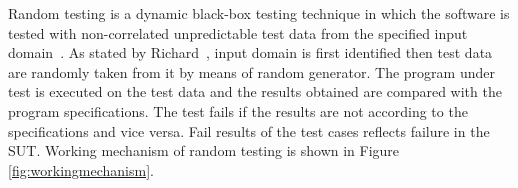 
Random testing is a dynamic black-box testing technique in which the software is tested with non-correlated unpredictable test data from the specified input domain~\cite{chan2003normalized}. As stated by Richard~\cite{hamlet1994random}, input domain is first identified then test data are randomly taken from it by means of random generator. The program under test is executed on the test data and the results obtained are compared with the program specifications. The test fails if the results are not according to the specifications and vice versa. Fail results of the test cases reflects failure in the SUT. Working mechanism of random testing is shown in Figure \ref{fig:workingmechanism}.




